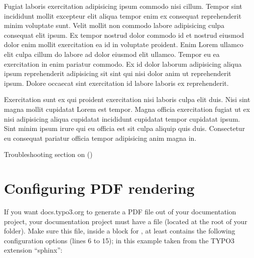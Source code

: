 \documentclass[a4paper,10pt,french]{sphinxmanual}
\begin{document}
Fugiat laboris exercitation adipisicing ipsum commodo nisi cillum. Tempor sint incididunt mollit excepteur elit aliqua tempor enim ex consequat reprehenderit minim voluptate sunt. Velit mollit non commodo labore adipisicing culpa consequat elit ipsum. Ex tempor nostrud dolor commodo id et nostrud eiusmod dolor enim mollit exercitation ea id in voluptate proident. Enim Lorem ullamco elit culpa cillum do labore ad dolor eiusmod elit ullamco. Tempor eu ea exercitation in enim pariatur commodo. Ex id dolor laborum adipisicing aliqua ipsum reprehenderit adipisicing sit sint qui nisi dolor anim ut reprehenderit ipsum. Dolore occaecat sint exercitation id labore laboris ex reprehenderit.

Exercitation sunt ex qui proident exercitation nisi laboris culpa elit duis. Nisi sint magna mollit cupidatat Lorem est tempor. Magna officia exercitation fugiat ut ex nisi adipisicing aliqua cupidatat incididunt cupidatat tempor cupidatat ipsum. Sint minim ipsum irure qui eu officia est sit culpa aliquip quis duis. Consectetur eu consequat pariatur officia tempor adipisicing anim magna in.




Troubleshooting section on {\hyperref[\detokenize{docs/tuts/autocad-tut02::doc}]{}} ()




\section{Configuring PDF rendering}
\label{\detokenize{docs/tuts/autocad-tut01:configuring-pdf-rendering}}
If you want docs.typo3.org to generate a PDF file out of your documentation project, your
documentation project must have a file  (located at the root of your
 folder). Make sure this file, inside a block for ,
at least contains the following configuration options (lines 6 to 15);
in this example taken from the TYPO3 extension ``sphinx'':
\end{document}
